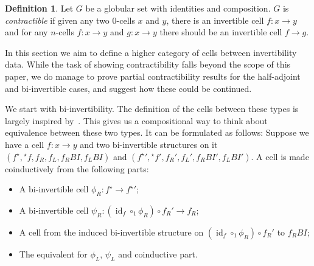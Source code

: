 \documentclass{article}
\theoremstyle{definition}
\newtheorem{definition}{Definition}
\theoremstyle{remark}
\DeclareMathOperator{\id}{id}
\newcommand{\linv}[1]{{}^\star\!#1}
\newcommand{\rinv}[1]{#1^\star}
\begin{document}
\begin{definition}
  Let \(G\) be a globular set with identities and composition. \(G\) is \emph{contractible} if given any two \(0\)-cells \(x\) and \(y\), there is an invertible cell \(f : x \to y\) and for any \(n\)-cells \(f : x \to y\) and \(g : x \to y\) there should be an invertible cell \(f \to g\).
\end{definition}

In this section we aim to define a higher category of cells between invertibility data. While the task of showing contractibility falls beyond the scope of this paper, we do manage to prove partial contractibility results for the half-adjoint and bi-invertible cases, and suggest how these could be continued.

We start with bi-invertibility. The definition of the cells between these types is largely inspired by~\cite[Lemma 4.2.5]{hottbook}. This gives us a compositional way to think about equivalence between these two types. It can be formulated as follows: Suppose we have a cell \(f : x \to y\) and two bi-invertible structures on it \((\rinv f, \linv f, f_R, f_L, f_R{}BI, f_L{}BI)\) and \((\rinv f{}' , \linv f{}', f_R', f_L', f_R{}BI', f_L{}BI')\). A cell is made coinductively from the following parts:
\begin{itemize}
\item A bi-invertible cell \(\phi_R : \rinv f \to \rinv f{}'\);
\item A bi-invertible cell \(\psi_R : (\id_f \circ_1 \phi_R) \circ f_R' \to f_R\);
\item A cell from the induced bi-invertible structure on \((\id_f \circ_1 \phi_R) \circ f_R'\) to \(f_R{}BI\);
\item The equivalent for \(\phi_L\), \(\psi_L\) and coinductive part.
\end{itemize}
\end{document}
